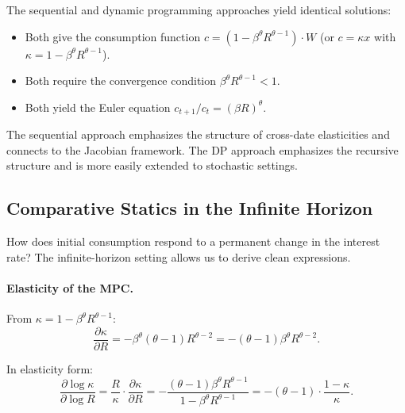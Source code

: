 \begin{calloutnote}
The sequential and dynamic programming approaches yield identical solutions:
\begin{itemize}[nosep]
\item Both give the consumption function $c = (1 - \beta^\theta R^{\theta - 1}) \cdot W$ (or $c = \kappa x$ with $\kappa = 1 - \beta^\theta R^{\theta - 1}$).
\item Both require the convergence condition $\beta^\theta R^{\theta - 1} < 1$.
\item Both yield the Euler equation $c_{t+1}/c_t = (\beta R)^\theta$.
\end{itemize}

The sequential approach emphasizes the structure of cross-date elasticities and connects to the Jacobian framework. The DP approach emphasizes the recursive structure and is more easily extended to stochastic settings.
\end{calloutnote}

\subsection{Comparative Statics in the Infinite Horizon}
\label{subsec:infinite-comparative-statics}

How does initial consumption respond to a permanent change in the interest rate? The infinite-horizon setting allows us to derive clean expressions.

\paragraph{Elasticity of the MPC.}
From $\kappa = 1 - \beta^\theta R^{\theta - 1}$:
\begin{equation}
\frac{\partial \kappa}{\partial R} = -\beta^\theta (\theta - 1) R^{\theta - 2} = -(\theta - 1) \beta^\theta R^{\theta - 2}.
\label{eq:kappa-R-derivative}
\end{equation}

In elasticity form:
\begin{equation}
\frac{\partial \log \kappa}{\partial \log R} = \frac{R}{\kappa} \cdot \frac{\partial \kappa}{\partial R} = -\frac{(\theta - 1) \beta^\theta R^{\theta - 1}}{1 - \beta^\theta R^{\theta - 1}} = -(\theta - 1) \cdot \frac{1 - \kappa}{\kappa}.
\label{eq:kappa-elasticity}
\end{equation}

